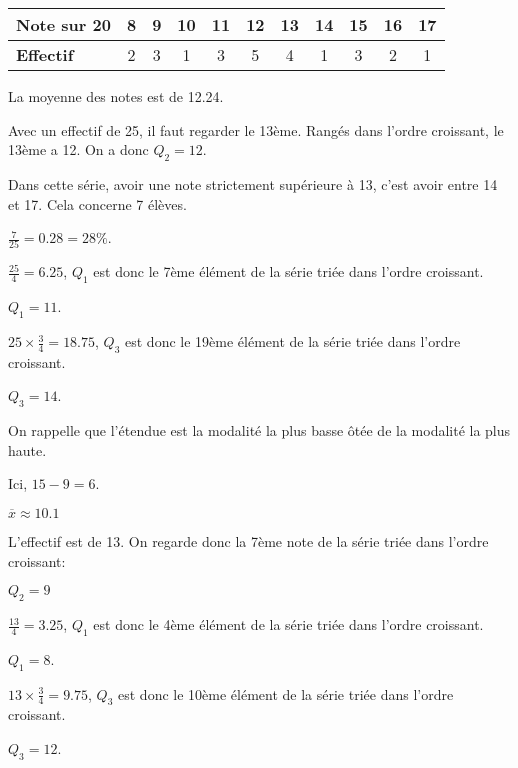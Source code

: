 \documentclass[a4paper,12pt]{scrartcl}
\begin{document}
\begin{center}
\begin{tabular}{|l|c|c|c|c|c|c|c|c|c|c|}\hline
\textbf{Note sur 20} & 8 & 9 & 10 & 11 & 12 & 13 & 14 & 15 & 16 & 17\\\hline
\textbf{Effectif} & 2 & 3 & 1 & 3 & 5 & 4 & 1 & 3 & 2 & 1\\\hline
\end{tabular}
\end{center}

La moyenne des notes est de 12.24.

\question{}
Avec un effectif de 25, il faut regarder le 13ème. Rangés dans l'ordre croissant, le 13ème a 12. On a donc $Q_2 = 12$.

\question{}
Dans cette série, avoir une note strictement supérieure à 13, c'est avoir entre 14 et 17. Cela concerne 7 élèves.

$\frac{7}{25} = 0.28 = 28\%$.


$\frac{25}{4} = 6.25$, $Q_1$ est donc le 7ème élément de la série triée dans l'ordre croissant. 

$Q_1 = 11$.


$25 \times \frac{3}{4} = 18.75$, $Q_3$ est donc le 19ème élément de la série triée dans l'ordre croissant. 

$Q_3 = 14$.

\exo{}

\question{}On rappelle que l'étendue est la modalité la plus basse ôtée de la modalité la plus haute.

Ici, $15-9 = 6$.

\question{}

$\overline{x} \approx 10.1$

\question{}
L'effectif est de 13. On regarde donc la 7ème note de la série triée dans l'ordre croissant:

$Q_2 = 9$


$\frac{13}{4} = 3.25$, $Q_1$ est donc le 4ème élément de la série triée dans l'ordre croissant. 

$Q_1 = 8$.


$13 \times \frac{3}{4} = 9.75$, $Q_3$ est donc le 10ème élément de la série triée dans l'ordre croissant. 

$Q_3 = 12$.
\end{document}
